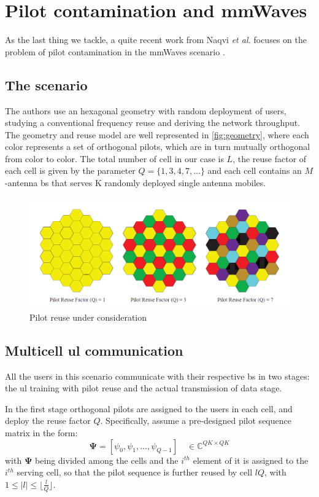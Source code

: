 \documentclass[11pt]{book}
\begin{document}
\section{Pilot contamination and mmWaves}
As the last thing we tackle, a quite recent work from Naqvi \textit{et al.} focuses on the problem of pilot contamination in the mmWaves scenario \cite{Ahsan2016}.
\subsection{The scenario}
The authors use an hexagonal geometry with random deployment of users, studying a conventional frequency reuse and deriving the network throughput. The geometry and reuse model are well represented in \autoref{fig:geometry}, where each color represents a set of orthogonal pilots, which are in turn mutually orthogonal from color to color. The total number of cell in our case is $L$, the reuse factor of each cell is given by the parameter $Q = \{1,3,4,7,\dots\}$ and each cell contains an $M$-antenna \gls{bs} that serves K randomly deployed single antenna mobiles.
\begin{figure}
\centering
  \includegraphics[width = .7\textwidth]{geometry.png}
  \caption{Pilot reuse under consideration}
  \label{fig:geometry}
\end{figure}
\subsection{Multicell \gls{ul} communication}
All the users in this scenario communicate with their respective \gls{bs} in two stages: the \gls{ul} training with pilot reuse and the actual transmission of data stage.

In the first stage orthogonal pilots are assigned to the users in each cell, and deploy the reuse factor $Q$. Specifically, assume a pre-designed pilot sequence matrix in the form:
\begin{equation}
  \mathbf{\Psi} = [\psi_0,\psi_1,\dots,\psi_{Q-1}] \quad \in \mathbb{C}^{QK\times QK}
\end{equation}
with $\mathbf{\Psi}$ being divided among the cells and the $i^{th}$ element of it is assigned to the $i^{th}$ serving cell, so that the pilot sequence is further reused by cell $lQ$, with $1 \leq |l| \leq \lfloor\frac{l}{Q}\rfloor$.
\end{document}
